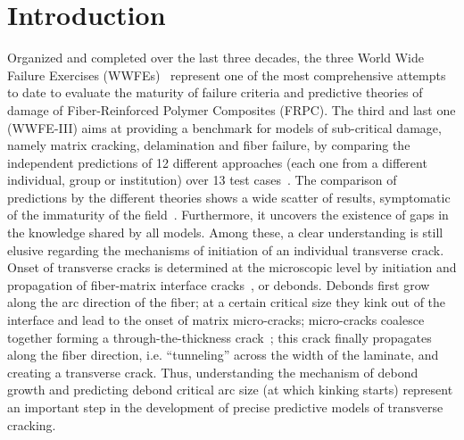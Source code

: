 \section{Introduction}

Organized and completed over the last three decades, the three World Wide Failure Exercises (WWFEs)~\cite{Hinton2004,Hinton2012,Kaddour2013a} represent one of the most comprehensive attempts to date to evaluate the maturity of failure criteria and predictive theories of damage of Fiber-Reinforced Polymer Composites (FRPC). The third and last one (WWFE-III) aims at providing a benchmark for models of sub-critical damage, namely matrix cracking, delamination and fiber failure, by comparing the independent predictions of 12 different approaches (each one from a different individual, group or institution) over 13 test cases~\cite{Kaddour2013a}. The comparison of predictions by the different theories shows a wide scatter of results, symptomatic of the immaturity of the field~\cite{Kaddour2013b}. Furthermore, it uncovers the existence of gaps in the knowledge shared by all models. Among these, a clear understanding is still elusive regarding the mechanisms of initiation of an individual transverse crack.\\
Onset of transverse cracks is determined at the microscopic level by initiation and propagation of fiber-matrix interface cracks~\cite{Bailey1981,Bailey1979}, or debonds. Debonds first grow along the arc direction of the fiber; at a certain critical size they kink out of the interface and lead to the onset of matrix micro-cracks; micro-cracks coalesce together forming a through-the-thickness crack~\cite{Zhang1997}; this crack finally propagates along the fiber direction, i.e. “tunneling” across the width of the laminate, and creating a transverse crack. Thus, understanding the mechanism of debond growth and predicting debond critical arc size (at which kinking starts) represent an important step in the development of precise predictive models of transverse cracking.

